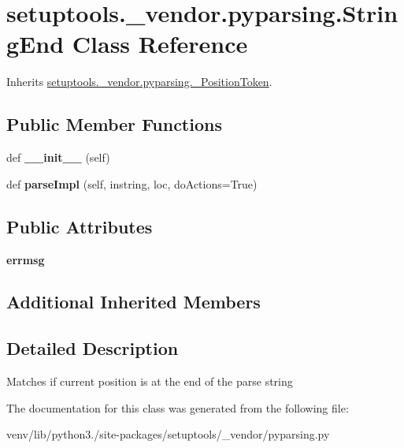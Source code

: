 \hypertarget{classsetuptools_1_1__vendor_1_1pyparsing_1_1_string_end}{}\section{setuptools.\+\_\+vendor.\+pyparsing.\+String\+End Class Reference}
\label{classsetuptools_1_1__vendor_1_1pyparsing_1_1_string_end}


Inherits \hyperlink{classsetuptools_1_1__vendor_1_1pyparsing_1_1___position_token}{setuptools.\+\_\+vendor.\+pyparsing.\+\_\+\+Position\+Token}.

\subsection*{Public Member Functions}
\begin{DoxyCompactItemize}
\item 
\mbox{\label{classsetuptools_1_1__vendor_1_1pyparsing_1_1_string_end_a0243eeb507fc6a50a63906376563b032}} 
def {\bfseries \+\_\+\+\_\+init\+\_\+\+\_\+} (self)
\item 
\mbox{\label{classsetuptools_1_1__vendor_1_1pyparsing_1_1_string_end_a346b807e2ffda561b16c29f9618a96ca}} 
def {\bfseries parse\+Impl} (self, instring, loc, do\+Actions=True)
\end{DoxyCompactItemize}
\subsection*{Public Attributes}
\begin{DoxyCompactItemize}
\item 
\mbox{\label{classsetuptools_1_1__vendor_1_1pyparsing_1_1_string_end_a8f2f9feb85aeecaecb6f4a5470637b3f}} 
{\bfseries errmsg}
\end{DoxyCompactItemize}
\subsection*{Additional Inherited Members}


\subsection{Detailed Description}
\begin{DoxyVerb}Matches if current position is at the end of the parse string
\end{DoxyVerb}
 

The documentation for this class was generated from the following file\+:\begin{DoxyCompactItemize}
\item 
venv/lib/python3./site-\/packages/setuptools/\+\_\+vendor/pyparsing.\+py\end{DoxyCompactItemize}
